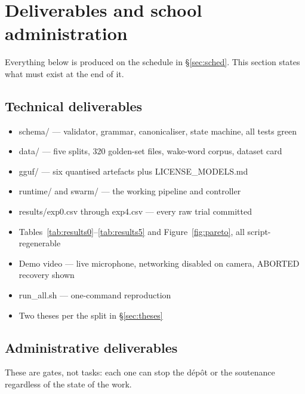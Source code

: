 \documentclass[11pt,a4paper]{article}
\newcommand{\code}[1]{{\ttfamily\small #1}}
\begin{document}
\section{Deliverables and school administration}
\label{sec:admin}

Everything below is produced on the schedule in \S\ref{sec:sched}. This section states what must exist at
the end of it.

\subsection{Technical deliverables}

\begin{itemize}[label=$\square$,leftmargin=1.6em,itemsep=2pt]
  \item \code{schema/} --- validator, grammar, canonicaliser, state machine, all tests green
  \item \code{data/} --- five splits, 320 golden-set files, wake-word corpus, dataset card
  \item \code{gguf/} --- six quantised artefacts plus \code{LICENSE\_MODELS.md}
  \item \code{runtime/} and \code{swarm/} --- the working pipeline and controller
  \item \code{results/exp0.csv} through \code{exp4.csv} --- every raw trial committed
  \item Tables~\ref{tab:results0}--\ref{tab:results5} and Figure~\ref{fig:pareto}, all script-regenerable
  \item Demo video --- live microphone, networking disabled on camera, \code{ABORTED} recovery shown
  \item \code{run\_all.sh} --- one-command reproduction
  \item Two theses per the split in \S\ref{sec:theses}
\end{itemize}

\subsection{Administrative deliverables}

These are gates, not tasks: each one can stop the d\'ep\^ot or the soutenance regardless of the state of
the work.
\end{document}
